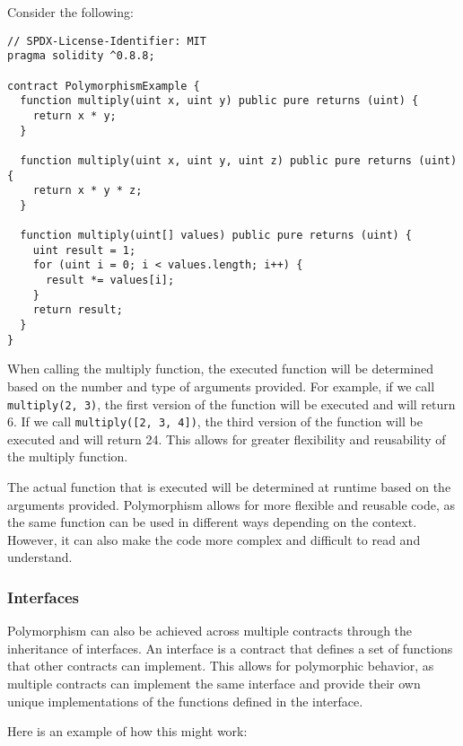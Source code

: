 \documentclass{article}
\theoremstyle{theorem}
\theoremstyle{definition}
\theoremstyle{remark}
\begin{document}
\medskip\noindent
Consider the following:
\begin{itemize}
\begin{lstlisting}
// SPDX-License-Identifier: MIT
pragma solidity ^0.8.8;

contract PolymorphismExample {
  function multiply(uint x, uint y) public pure returns (uint) {
    return x * y;
  }

  function multiply(uint x, uint y, uint z) public pure returns (uint) {
    return x * y * z;
  }

  function multiply(uint[] values) public pure returns (uint) {
    uint result = 1;
    for (uint i = 0; i < values.length; i++) {
      result *= values[i];
    }
    return result;
  }
}

\end{lstlisting}

\end{itemize}

\noindent
When calling the multiply function, the executed function will be determined based on the number and type of arguments provided. For example, if we call \texttt{multiply(2, 3)}, the first version of the function will be executed and will return 6. If we call \texttt{multiply([2, 3, 4])}, the third version of the function will be executed and will return 24. This allows for greater flexibility and reusability of the multiply function.

\medskip\noindent
The actual function that is executed will be determined at runtime based on the arguments provided. Polymorphism allows for more flexible and reusable code, as the same function can be used in different ways depending on the context. However, it can also make the code more complex and difficult to read and understand.


\subsubsection{Interfaces} \label{interfaces}

Polymorphism can also be achieved across multiple contracts through the inheritance of interfaces. An interface is a contract that defines a set of functions that other contracts can implement. This allows for polymorphic behavior, as multiple contracts can implement the same interface and provide their own unique implementations of the functions defined in the interface.


\medskip\noindent
Here is an example of how this might work:
\end{document}
